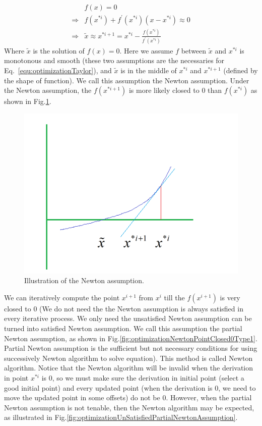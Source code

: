 \documentclass[runningheads,openany]{xhlPaper}
\begin{document}
\begin{equation}
\label{equ:optimizationApproximatePoint}
\begin{aligned}
&f\left( x \right) = 0\\
\Rightarrow &f\left( {{x^{*i}}} \right) + {f^{'}}\left( {{x^{*i}}} \right)\left( {x - {x^{*i}}} \right) \approx 0\\
\Rightarrow &\tilde x \approx {x^{*i + 1}} = {x^{*i}} - \frac{{f\left( {{x^{*i}}} \right)}}{{{f^{'}}\left( {{x^{*i}}} \right)}}
\end{aligned}
\end{equation}
Where $\tilde x$ is the solution of $f\left(x\right) = 0$. Here we assume $f$ between $\tilde{x}$ and $x^{*i}$ is monotonous and smooth (these two assumptions are the necessaries for Eq.~\ref{equ:optimizationTaylor}), and $\tilde x$ is in the middle of $x^{*i}$ and $x^{*i + 1}$ (defined by the shape of function). We call this assumption the Newton assumption.
Under the Newton assumption, the $f\left(x^{*i + 1}\right)$ is more likely closed to 0 than $f\left(x^{*i}\right)$ as shown in Fig.\ref{fig:optimizationNewtonPointClosed0Type0}. 

\begin{figure}
\centering
\includegraphics[width=0.7\linewidth]{optimizationNewtonPointClosed0Type0}
\caption{Illustration of the Newton assumption.}
\label{fig:optimizationNewtonPointClosed0Type0}
\end{figure}

We can iteratively compute the point $x^{i + 1}$ from $x^{i}$ till the $f\left(x^{i + 1}\right)$ is very closed to 0 (We do not need the the Newton assumption is always satisfied in every iterative process. We only need the unsatisfied Newton assumption can be turned into satisfied Newton assumption. We call this assumption the partial Newton assumption, as shown in Fig.\ref{fig:optimizationNewtonPointClosed0Type1}. Partial Newton assumption is the sufficient but not necessary conditions for using successively  Newton algorithm to solve equation). This method is called Newton algorithm. Notice that the Newton algorithm will be invalid when the derivation in point $x^{*i}$ is 0, so we must make sure the derivation in initial point (select a good initial point) and every updated point (when the derivation is 0, we need to move the updated point in some offsets) do not be 0. 
However, when the partial Newton assumption is not tenable, then the Newton algorithm may be expected, as illustrated in Fig.\ref{fig:optimizationUnSatisfiedPartialNewtonAssumption}.
\end{document}
